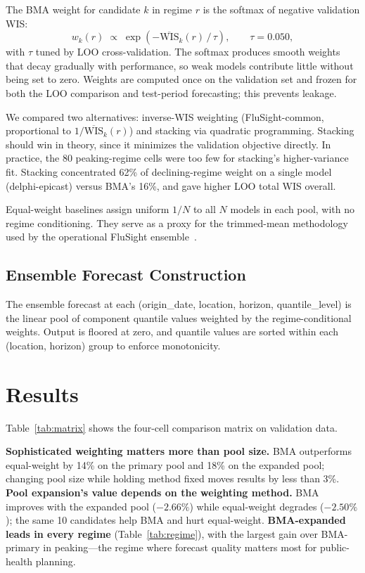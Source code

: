 \documentclass[11pt]{article}
\begin{document}
The BMA weight for candidate $k$ in regime $r$ is the softmax of
negative validation WIS:
\[
w_k(r) \;\propto\; \exp\!\left(-\overline{\mathrm{WIS}}_k(r)\,/\,\tau\right),
\qquad \tau = 0.050,
\]
with $\tau$ tuned by LOO cross-validation. The softmax produces
smooth weights that decay gradually with performance, so weak models
contribute little without being set to zero. Weights are computed
once on the validation set and frozen for both the LOO comparison
and test-period forecasting; this prevents leakage.

We compared two alternatives: inverse-WIS weighting (FluSight-common,
proportional to $1/\overline{\mathrm{WIS}}_k(r)$) and stacking via
quadratic programming. Stacking should win in theory, since it
minimizes the validation objective directly. In practice, the 80
peaking-regime cells were too few for stacking's higher-variance
fit. Stacking concentrated 62\% of declining-regime weight on a
single model (delphi-epicast) versus BMA's 16\%, and gave higher
LOO total WIS overall.

Equal-weight baselines assign uniform $1/N$ to all $N$ models in
each pool, with no regime conditioning. They serve as a proxy for
the trimmed-mean methodology used by the operational FluSight
ensemble~\cite{ray2023ensemble}.

\subsection{Ensemble Forecast Construction}

The ensemble forecast at each (origin\_date, location, horizon,
quantile\_level) is the linear pool of component quantile values
weighted by the regime-conditional weights. Output is floored at
zero, and quantile values are sorted within each (location, horizon)
group to enforce monotonicity.

\section{Results}

Table~\ref{tab:matrix} shows the four-cell comparison matrix on
validation data.

\textbf{Sophisticated weighting matters more than pool size.} BMA
outperforms equal-weight by 14\% on the primary pool and 18\% on
the expanded pool; changing pool size while holding method fixed
moves results by less than 3\%. \textbf{Pool expansion's value
depends on the weighting method.} BMA improves with the expanded
pool ($-2.66\%$) while equal-weight degrades ($-2.50\%$); the same
10 candidates help BMA and hurt equal-weight. \textbf{BMA-expanded
leads in every regime} (Table~\ref{tab:regime}), with the largest
gain over BMA-primary in peaking---the regime where forecast
quality matters most for public-health planning.
\end{document}
